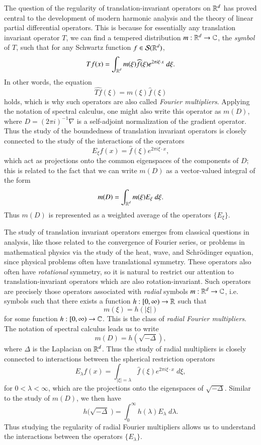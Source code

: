 The question of the regularity of translation-invariant operators on $\operatorname{\mathbb{R}}^d$ has proved central to the development of modern harmonic analysis and the theory of linear partial differential operators. This is because for essentially any translation invariant operator $T$, we can find a tempered distribution $m: \operatorname{\mathbb{R}}^d \to \operatorname{\mathbb{C}}$, the \emph{symbol} of $T$, such that for any Schwartz function $f \in \mathcal{S}(\operatorname{\mathbb{R}}^d)$,
%
\[ Tf(x) = \int_{\operatorname{\mathbb{R}}^d} m(\xi) \widehat{f}(\xi) e^{2 \pi i \xi \cdot x}\; d\xi. \]
%
In other words, the equation
%
\[ \widehat{Tf}(\xi) = m(\xi) \widehat{f}(\xi) \]
%
holds, which is why such operators are also called \emph{Fourier multipliers}. Applying the notation of spectral calculus, one might also write this operator as $m(D)$, where $D = (2 \pi i)^{-1} \nabla$ is a self-adjoint normalization of the gradient operator. Thus the study of the boundedness of translation invariant operators is closely connected to the study of the interactions of the operators
%
\[ E_\xi f(x) = \widehat{f}(\xi) e^{2 \pi i \xi \cdot x}, \]
%
which act as projections onto the common eigenspaces of the components of $D$; this is related to the fact that we can write $m(D)$ as a vector-valued integral of the form
%
\[ m(D) = \int_{\operatorname{\mathbb{R}}^d} m(\xi) E_\xi\; d\xi. \]
%
Thus $m(D)$ is represented as a weighted average of the operators $\{ E_\xi \}$.

The study of translation invariant operators emerges from classical questions in analysis, like those related to the convergence of Fourier series, or problems in mathematical physics via the study of the heat, wave, and Schr\"{o}dinger equation, since physical problems often have translational symmetry. These operators also often have \emph{rotational} symmetry, so it is natural to restrict our attention to translation-invariant operators which are also rotation-invariant. Such operators are precisely those operators associated with \emph{radial} symbols $m: \operatorname{\mathbb{R}}^d \to \operatorname{\mathbb{C}}$, i.e. symbols such that there exists a function $h: [0,\infty) \to \operatorname{\mathbb{R}}$ such that
%
\[ m(\xi) = h(|\xi|) \]
%
for some function $h: [0,\infty) \to \operatorname{\mathbb{C}}$. This is the class of \emph{radial Fourier multipliers}. The notation of spectral calculus leads us to write
%
\[ m(D) = h \left( \sqrt{-\Delta} \right), \]
%
where $\Delta$ is the Laplacian on $\operatorname{\mathbb{R}}^d$. Thus the study of radial multipliers is closely connected to interactions between the spherical restriction operators
%
\[ E_\lambda f(x) = \int_{|\xi| = \lambda} \widehat{f}(\xi) e^{2 \pi i \xi \cdot x}\; d\xi, \]
%
for $0 < \lambda < \infty$, which are the projections onto the eigenspaces of $\sqrt{-\Delta}$. Similar to the study of $m(D)$, we then have
%
\[ h \Big( \sqrt{-\Delta}\; \Big) = \int_0^\infty h(\lambda) E_\lambda\; d\lambda. \]
%
Thus studying the regularity of radial Fourier multipliers allows us to understand the interactions between the operators $\{ E_\lambda \}$.

